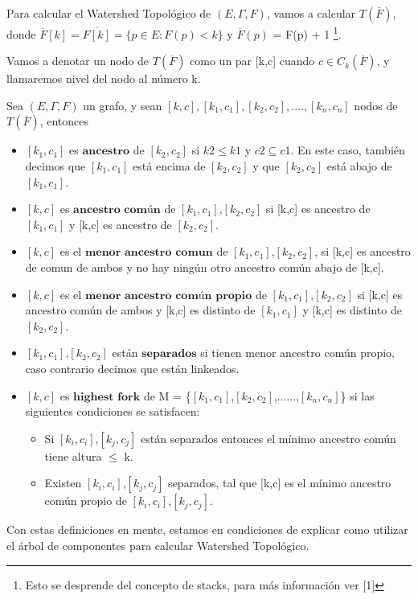 Para calcular el Watershed Topológico de $(E,\Gamma,F)$, vamos a calcular $T(\overline{F})$, donde $\overline{F}[k] = \overline{F[k]} = \{ p \in E : F(p) < k \}$ y $\overline{F}(p)$ = F(p) + 1 \footnote{Esto se desprende del concepto de stacks, para más información ver [1]}.

Vamos a denotar un nodo de $T(\overline{F})$ como un par [k,c] cuando $c \in C_k(\overline{F})$, y llamaremos nivel del nodo al número k.

Sea $(E,\Gamma,F)$ un grafo, y sean $[k,c], [k_1,c_1], [k_2,c_2], .... , [k_n,c_n]$ nodos de $T(\overline{F})$, entonces

\begin{itemize}
  \item $[k_1,c_1]$ es $\textbf{ancestro}$ de $[k_2,c_2]$ si $k2 \le k1$ y $c2 \subseteq c1$. En este caso, también decimos que $[k_1,c_1]$ está encima de $[k_2,c_2]$ y que $[k_2,c_2]$ está abajo de $[k_1,c_1]$.
  \item $[k,c]$ es $\textbf{ancestro común}$ de $[k_1,c_1]$,$[k_2,c_2]$ si [k,c] es ancestro de $[k_1,c_1]$ y [k,c] es ancestro de $[k_2,c_2]$.
  \item $[k,c]$ es el $\textbf{menor ancestro comun}$ de $[k_1,c_1]$,$[k_2,c_2]$, si [k,c] es ancestro de comun de ambos y no hay ningún otro ancestro común abajo de [k,c].
  \item $[k,c]$ es el $\textbf{menor ancestro común propio}$ de $[k_1,c_1]$,$[k_2,c_2]$ si [k,c] es ancestro común de ambos y [k,c] es distinto de $[k_1,c_1]$ y [k,c] es distinto de $[k_2,c_2]$.
  \item $[k_1,c_1]$,$[k_2,c_2]$ están $\textbf{separados}$ si tienen menor ancestro común propio, caso contrario decimos que están linkeados.
  \item $[k,c]$ es $\textbf{highest fork}$ de M = \{$[k_1,c_1]$,$[k_2,c_2]$,......,$[k_n,c_n]$\} si las siguientes condiciones se satisfacen:
  \begin{itemize}
    \item Si $[k_i,c_i]$,$[k_j,c_j]$ están separados entonces el mínimo ancestro común tiene altura $\le$ k.
    \item Existen $[k_i,c_i]$,$[k_j,c_j]$ separados, tal que [k,c] es el mínimo ancestro común propio de $[k_i,c_i]$,$[k_j,c_j]$. 
  \end{itemize}
\end{itemize}

 
Con estas definiciones en mente, estamos en condiciones de explicar como utilizar el árbol de componentes para calcular Watershed Topológico.

